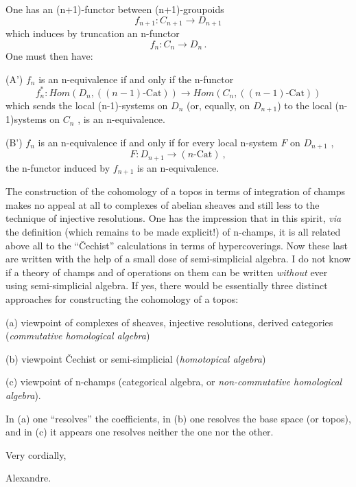 
One has an (n+1)-functor between (n+1)-groupoids
\[ f_{n+1} : C_{n+1} \longrightarrow D_{n+1} \]
which induces by truncation an n-functor
\[ f_n : C_n \longrightarrow D_n \, . \]
One must then have:

(A') $f_n$ is an n-equivalence if and only if the n-functor
\[ f_n^{*} : \mathit{Hom}(D_n, ((n-1)\text{-Cat})) \longrightarrow \mathit{Hom}(C_n, ((n-1)\text{-Cat})) \]
which sends the local (n-1)-systems on $D_n$ (or, equally, on $D_{n+1}$)
to the local (n-1)systems on $C_n$ , is an n-equivalence.

(B') $f_n$ is an n-equivalence if and only if for every local n-system $F$
on $D_{n+1}$ ,
\[ F : D_{n+1} \longrightarrow (n\text{-Cat}) \ , \]
the n-functor induced by $f_{n+1}$
is an n-equivalence.

The construction of the cohomology of a topos in terms of integration
of champs makes no appeal at all to complexes of abelian sheaves and still
less to the technique of injective resolutions. One has the impression that
in this spirit, \textit{via} the definition (which remains to be made explicit!) of
n-champs, it is all related above all to the ``\v{C}echist'' calculations in terms
of hypercoverings. Now these last are written with the help of a small dose
of semi-simplicial algebra. I do not know if a theory of champs and of
operations on them can be written \textit{without} ever using semi-simplicial algebra.
If yes, there would be essentially three distinct approaches for constructing
the cohomology of a topos:

(a) viewpoint of complexes of sheaves, injective resolutions, derived
categories (\textit{commutative homological algebra})

(b) viewpoint \v{C}echist or semi-simplicial (\textit{homotopical algebra})

(c) viewpoint of n-champs (categorical algebra, or \textit{non-commutative homological
algebra}).

In (a) one ``resolves'' the coefficients, in (b) one resolves the base
space (or topos), and in (c) it appears one resolves neither the one nor the
other.

Very cordially,

Alexandre.

